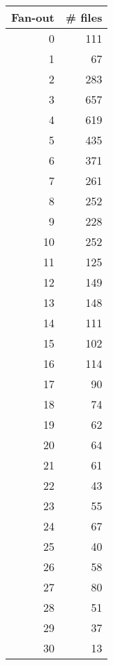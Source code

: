 \begin{tabular}{|r|r|}
\hline
\bf Fan-out&\bf \# files\\
\hline
0&111\\
\hline
1&67\\
\hline
2&283\\
\hline
3&657\\
\hline
4&619\\
\hline
5&435\\
\hline
6&371\\
\hline
7&261\\
\hline
8&252\\
\hline
9&228\\
\hline
10&252\\
\hline
11&125\\
\hline
12&149\\
\hline
13&148\\
\hline
14&111\\
\hline
15&102\\
\hline
16&114\\
\hline
17&90\\
\hline
18&74\\
\hline
19&62\\
\hline
20&64\\
\hline
21&61\\
\hline
22&43\\
\hline
23&55\\
\hline
24&67\\
\hline
25&40\\
\hline
26&58\\
\hline
27&80\\
\hline
28&51\\
\hline
29&37\\
\hline
30&13\\
\hline
\end{tabular}
